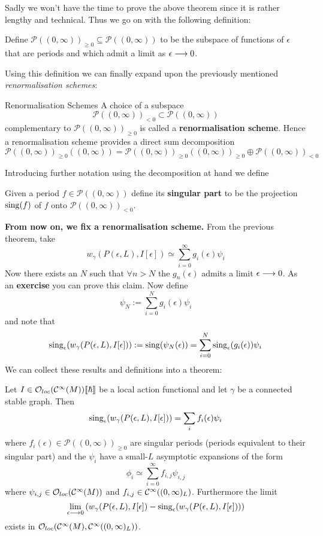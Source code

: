 Sadly we won't have the time to prove the above theorem since it is rather lengthy and technical. Thus we go on with the following definition:

\begin{definition}
  Define $\mathcal{P}((0,\infty))_{\geq 0} \subseteq \mathcal{P}((0,\infty))$ to be the subspace of functions of $\epsilon$ that are periods and which admit a limit as $\epsilon \lra 0$.
\end{definition}

Using this definition we can finally expand upon the previously mentioned \emph{renormalisation schemes}:

\begin{definition}{Renormalisation Schemes}
  A choice of a subspace
  $$ \mathcal{P}((0,\infty))_{< 0} \subset \mathcal{P}((0,\infty))  $$
  complementary to $\mathcal{P}((0,\infty))_{\geq 0}$ is called a \textbf{renormalisation scheme}. Hence a renormalisation scheme provides a direct sum decomposition
  $$ \mathcal{P}((0,\infty))_{\geq 0}((0,\infty)) = \mathcal{P}((0,\infty))_{\geq 0}((0,\infty))_{\geq 0} \oplus \mathcal{P}((0,\infty))_{< 0} $$
\end{definition}

Introducing further notation using the decomposition at hand we define

\begin{definition}
  Given a period $f \in \mathcal{P}((0,\infty))$ define its \textbf{singular part} to be the projection $\operatorname{sing}(f)$ of $f$ onto $\mathcal{P}((0,\infty))_{< 0}$.
\end{definition}

\textbf{From now on, we fix a renormalisation scheme.} From the previous theorem, take
$$ w_\gamma (P(\epsilon,L), I[\epsilon]) \simeq \sum_{i=0}^{\infty} g_i(\epsilon) \psi_i $$
Now there exists an $N$ such that $\forall n > N$ the $g_n(\epsilon)$ admits a limit $\epsilon \lra 0$. As an \textbf{exercise} you can prove this claim. Now define
$$ \psi_N := \sum_{i=0}^N g_i(\epsilon) \psi_i $$
and note that
$$ \sing_\epsilon (w_\gamma(P(\epsilon,L), I[\epsilon])) := \sing( \psi_N(\epsilon)) = \sum_{i=0}^N \sing_\epsilon(g_i(\epsilon)) \psi_i $$
We can collect these results and definitions into a theorem:

\begin{theo}
  Let $I \in \mathcal{O}_{loc}(\mathcal{C}^{\infty}(M)) \llbracket \hbar \rrbracket$ be a local action functional and let $\gamma$ be a connected stable graph. Then
  $$ \sing_\epsilon(w_\gamma(P(\epsilon,L), I[\epsilon])) = \sum_i f_i(\epsilon) \psi_i  $$
  where $f_i(\epsilon) \in \mathcal{P}((0,\infty))_{\geq 0}$ are singular periods (periods equivalent to their singular part) and the $\psi_i$ have a small-$L$ asymptotic expansions of the form
  $$ \phi_i \simeq \sum_{i = 0}^\infty f_{i,j} \psi_{i,j} $$
  where $\psi_{i,j} \in \mathcal{O}_{loc}(\mathcal{C}^{\infty}(M))$ and $f_{i,j} \in \mathcal{C}^{\infty}((0,\infty)_L)$. Furthermore the limit
  $$ \lim_{\epsilon \lra 0} \left( w_\gamma (P(\epsilon,L), I[\epsilon]) - \sing_\epsilon(w_\gamma (P(\epsilon,L), I[\epsilon])) \right) $$
  exists in $\mathcal{O}_{loc}(\mathcal{C}^{\infty}(M), \mathcal{C}^{\infty}((0,\infty)_L))$.
\end{theo}

